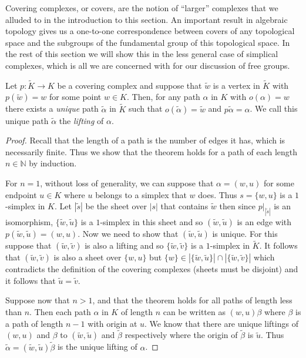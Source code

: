 Covering complexes, or covers, are the notion of ``larger'' complexes that we alluded to in the introduction to this section. An important result in algebraic topology gives us a one-to-one correspondence between covers of any topological space and the subgroups of the fundamental group of this topological space. In the rest of this section we will show this in the less general case of simplical complexes, which is all we are concerned with for our discussion of free groups.

\begin{theorem}
  Let $p:\tilde{K} \rightarrow K$ be a covering complex and suppose that $\tilde{w}$ is a vertex in $\tilde{K}$ with $p(\tilde{w}) = w$ for some point $w \in K$. Then, for any path $\alpha$ in $K$ with $o(\alpha) = w$ there exists a \emph{unique} path $\tilde{\alpha}$ in $\tilde{K}$ such that $o(\tilde{\alpha}) = \tilde{w}$ and $p\tilde{\alpha} = \alpha$. We call this unique path $\tilde{\alpha}$ the \emph{lifting} of $\alpha$.
\end{theorem}

\begin{proof}
  Recall that the length of a path is the number of edges it has, which is necessarily finite. Thus we show that the theorem holds for a path of each length $n \in \mathbb{N}$ by induction.

  For $n=1$, without loss of generality, we can suppose that $\alpha = (w,u)$ for some endpoint $u \in K$ where $u$ belongs to a simplex that $w$ does. Thus $s = \{ w,u \}$ is a $1$-simplex in $K$. Let $|\tilde{s}|$ be the sheet over $|s|$ that contains $\tilde{w}$ then since $p \vert_{|\tilde{s}|}$ is an isomorphism, $\{ \tilde{w}, \tilde{u}\}$ is a $1$-simplex in this sheet and so $(\tilde{w},\tilde{u})$ is an edge with $p(\tilde{w},\tilde{u})=(w,u)$. Now we need to show that $(\tilde{w}, \tilde{u})$ is unique. For this suppose that $(\tilde{w}, \tilde{v})$ is also a lifting and so $\{ \tilde{w}, \tilde{v} \}$ is a $1$-simplex in $\tilde{K}$. It follows that $(\tilde{w}, \tilde{v})$ is also a sheet over $\{ w,u \}$ but $\{w\} \in |\{\tilde{w}, \tilde{u}\}| \cap |\{\tilde{w}, \tilde{v}\}|$ which contradicts the definition of the covering complexes (sheets must be disjoint) and it follows that $\tilde{u} = \tilde{v}$.

  Suppose now that $n>1$, and that the theorem holds for all paths of length less than $n$. Then each path $\alpha$ in $K$ of length $n$ can be written as $(w,u)\beta$ where $\beta$ is a path of length $n-1$ with origin at $u$. We know that there are unique liftings of $(w,u)$ and $\beta$ to $(\tilde{w},\tilde{u})$ and $\tilde{\beta}$ respectively where the origin of $\tilde{\beta}$ is $\tilde{u}$. Thus $\tilde{\alpha} = (\tilde{w},\tilde{u})\tilde{\beta}$ is the unique lifting of $\alpha$.
\end{proof}

